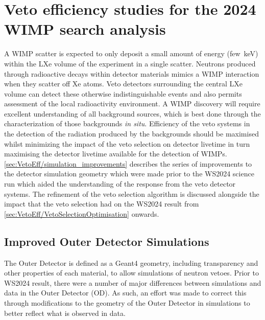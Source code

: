 \chapter{Veto efficiency studies for the 2024 WIMP search analysis}\label{chap:VetoEfficiency}
A WIMP scatter is expected to only deposit a small amount of energy (few~keV) within the LXe volume of the experiment in a single scatter. 
Neutrons produced through radioactive decays within detector materials mimics a WIMP interaction when they scatter off Xe atoms. Veto detectors surrounding the central LXe volume can detect these otherwise indistinguishable events and also permits assessment of the local radioactivity environment. A WIMP discovery will require excellent understanding of all background sources, which is best done through the characterization of those backgrounds \textit{in situ}. Efficiency of the veto systems in the detection of the radiation produced by the backgrounds should be maximised whilst minimizing the impact of the veto selection on detector livetime in turn maximising the detector livetime available for the detection of WIMPs. \autoref{sec:VetoEff/simulation_improvements} describes the series of improvements to the detector simulation geometry which were made prior to the WS2024 science run which aided the understanding of the response from the veto detector systems. The refinement of the veto selection algorithm is discussed alongside the impact that the veto selection had on the WS2024 result from \autoref{sec:VetoEff/VetoSelectionOptimisation} onwards.

\section{Improved Outer Detector Simulations}\label{sec:VetoEff/simulation_improvements}
The Outer Detector is defined as a Geant4 geometry, including transparency and other properties of each material, to allow simulations of neutron vetoes. 
Prior to WS2024 result, there were a number of major differences between simulations and data in the Outer Detector (OD). As such, an effort was made to correct this through modifications to the geometry of the Outer Detector in simulations to better reflect what is observed in data.
